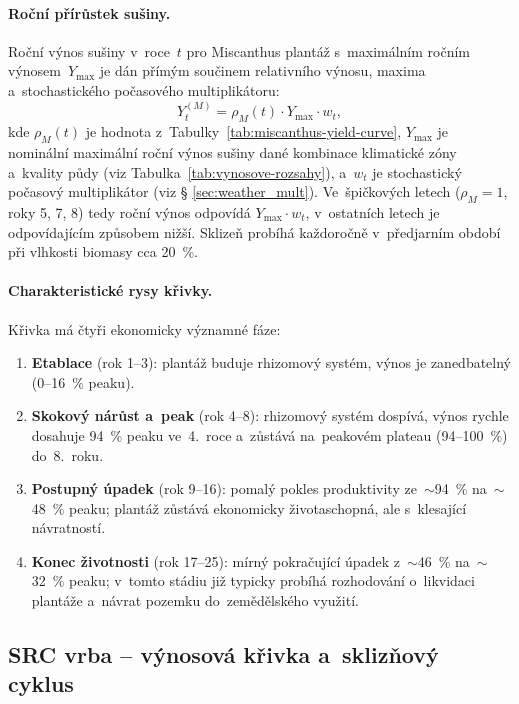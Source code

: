 \paragraph{Roční přírůstek sušiny.}
Roční výnos sušiny v~roce~$t$ pro Miscanthus plantáž s~maximálním ročním
výnosem~$Y_{\max}$ je dán přímým součinem relativního výnosu, maxima
a~stochastického počasového multiplikátoru:
\begin{equation}
    Y_{t}^{(M)} = \rho_M(t) \cdot Y_{\max} \cdot w_t,
    \label{eq:miscanthus-yield}
\end{equation}
kde $\rho_M(t)$ je hodnota z~Tabulky~\ref{tab:miscanthus-yield-curve},
$Y_{\max}$ je nominální maximální roční výnos sušiny dané kombinace
klimatické zóny a~kvality půdy (viz Tabulka~\ref{tab:vynosove-rozsahy}),
a~$w_t$ je stochastický počasový multiplikátor (viz § \ref{sec:weather_mult}).
Ve~špičkových letech ($\rho_M = 1$, roky 5, 7, 8) tedy roční výnos
odpovídá $Y_{\max} \cdot w_t$, v~ostatních letech je odpovídajícím
způsobem nižší. Sklizeň probíhá každoročně v~předjarním období při
vlhkosti biomasy cca 20~\%.

\paragraph{Charakteristické rysy křivky.}
Křivka má čtyři ekonomicky významné fáze:
\begin{enumerate}
    \item \textbf{Etablace} (rok 1--3): plantáž buduje rhizomový systém,
          výnos je zanedbatelný (0--16~\% peaku).
    \item \textbf{Skokový nárůst a~peak} (rok 4--8): rhizomový systém
          dospívá, výnos rychle dosahuje 94~\% peaku ve~4.~roce a~zůstává
          na~peakovém plateau (94--100~\%) do~8.~roku.
    \item \textbf{Postupný úpadek} (rok 9--16): pomalý pokles produktivity
          ze~$\sim$94~\% na~$\sim$48~\% peaku; plantáž zůstává
          ekonomicky životaschopná, ale s~klesající návratností.
    \item \textbf{Konec životnosti} (rok 17--25): mírný pokračující
          úpadek z~$\sim$46~\% na~$\sim$32~\% peaku; v~tomto stádiu
          již typicky probíhá rozhodování o~likvidaci plantáže
          a~návrat pozemku do~zemědělského využití.
\end{enumerate}


\subsection{SRC vrba -- výnosová křivka a~sklizňový cyklus}
\label{subsec:src-vynosy}

